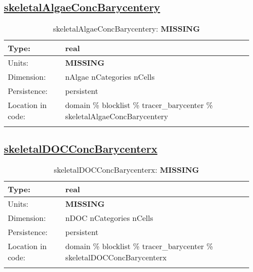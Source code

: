 \subsection[skeletalAlgaeConcBarycentery]{\hyperref[sec:var_tab_tracer_barycenter]{skeletalAlgaeConcBarycentery}}
\label{subsec:var_sec_tracer_barycenter_skeletalAlgaeConcBarycentery}
\begin{center}
\begin{longtable}{| p{2.0in} | p{4.0in} |}
        \hline 
        Type: & real \\
        \hline 
        Units: & {\bf \color{red} MISSING} \\
        \hline 
        Dimension: & nAlgae nCategories nCells \\
        \hline 
        Persistence: & persistent \\
        \hline 
         Location in code: & domain \% blocklist \% tracer\_barycenter \% skeletalAlgaeConcBarycentery \\
         \hline 
    \caption{skeletalAlgaeConcBarycentery: {\bf \color{red} MISSING}}
\end{longtable}
\end{center}
\subsection[skeletalDOCConcBarycenterx]{\hyperref[sec:var_tab_tracer_barycenter]{skeletalDOCConcBarycenterx}}
\label{subsec:var_sec_tracer_barycenter_skeletalDOCConcBarycenterx}
\begin{center}
\begin{longtable}{| p{2.0in} | p{4.0in} |}
        \hline 
        Type: & real \\
        \hline 
        Units: & {\bf \color{red} MISSING} \\
        \hline 
        Dimension: & nDOC nCategories nCells \\
        \hline 
        Persistence: & persistent \\
        \hline 
         Location in code: & domain \% blocklist \% tracer\_barycenter \% skeletalDOCConcBarycenterx \\
         \hline 
    \caption{skeletalDOCConcBarycenterx: {\bf \color{red} MISSING}}
\end{longtable}
\end{center}
